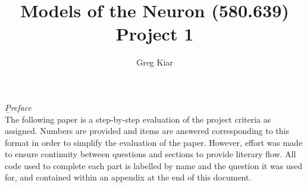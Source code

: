 \documentclass[10pt]{report}
\begin{document}
\title{ \vspace{-30mm} Models of the Neuron (580.639)\\Project 1}
\author{Greg Kiar}

\maketitle
\emph{\b{Preface}} \\
The following paper is a step-by-step evaluation of the project criteria as assigned. Numbers are provided and items are answered corresponding to this format in order to simplify the evaluation of the paper. However, effort was made to ensure continuity between questions and sections to provide literary flow. All code used to complete each part is labelled by name and the question it was used for, and contained within an appendix at the end of this document.
\end{document}
